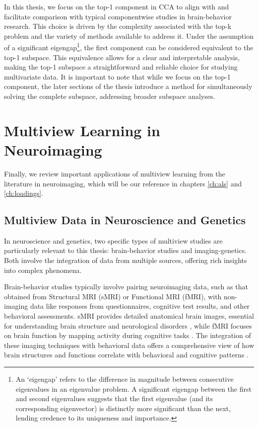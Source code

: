 In this thesis, we focus on the top-1 component in CCA to align with and facilitate comparison with typical componentwise studies in brain-behavior research.
This choice is driven by the complexity associated with the top-k problem and the variety of methods available to address it.
Under the assumption of a significant eigengap\footnote{An `eigengap' refers to the difference in magnitude between consecutive eigenvalues in an eigenvalue problem. A significant eigengap between the first and second eigenvalues suggests that the first eigenvalue (and its corresponding eigenvector) is distinctly more significant than the next, lending credence to its uniqueness and importance.}, the first component can be considered equivalent to the top-1 subspace.
This equivalence allows for a clear and interpretable analysis, making the top-1 subspace a straightforward and reliable choice for studying multivariate data.
It is important to note that while we focus on the top-1 component, the later sections of the thesis introduce a method for simultaneously solving the complete subspace, addressing broader subspace analyses.


\section{Multiview Learning in Neuroimaging}

Finally, we review important applications of multiview learning from the literature in neuroimaging, which will be our reference in chapters \ref{ch:als} and \ref{ch:loadings}.

\subsection{Multiview Data in Neuroscience and Genetics}

In neuroscience and genetics, two specific types of multiview studies are particularly relevant to this thesis: brain-behavior studies and imaging-genetics.
Both involve the integration of data from multiple sources, offering rich insights into complex phenomena.

Brain-behavior studies typically involve pairing neuroimaging data, such as that obtained from Structural MRI (sMRI) or Functional MRI (fMRI), with non-imaging data like responses from questionnaires, cognitive test results, and other behavioral assessments.
sMRI provides detailed anatomical brain images, essential for understanding brain structure and neurological disorders \citep{kanai2011structural}, while fMRI focuses on brain function by mapping activity during cognitive tasks \citep{miranda2021systematic}.
The integration of these imaging techniques with behavioral data offers a comprehensive view of how brain structures and functions correlate with behavioral and cognitive patterns \citep{rypma2001age,genon2022linking}.

